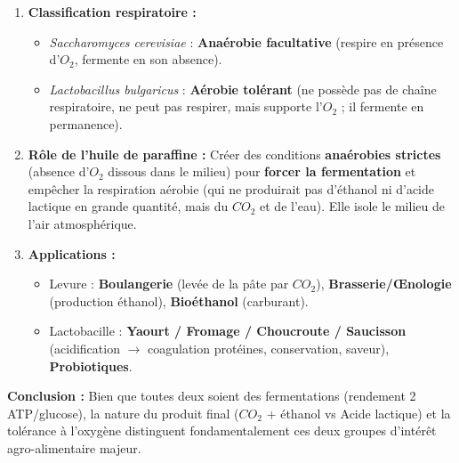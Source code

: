 \documentclass[11pt]{article}
\begin{document}
\begin{exoresolu}
\begin{enumerate}
\begin{itemize}
              \end{itemize}
        \item \textbf{Classification respiratoire :}
              \begin{itemize}
                  \item \emph{Saccharomyces cerevisiae} : \textbf{Anaérobie facultative} (respire en présence d'$O_2$, fermente en son absence).
                  \item \emph{Lactobacillus bulgaricus} : \textbf{Aérobie tolérant} (ne possède pas de chaîne respiratoire, ne peut pas respirer, mais supporte l'$O_2$ ; il fermente en permanence).
              \end{itemize}
        \item \textbf{Rôle de l'huile de paraffine :} Créer des conditions \textbf{anaérobies strictes} (absence d'$O_2$ dissous dans le milieu) pour \textbf{forcer la fermentation} et empêcher la respiration aérobie (qui ne produirait pas d'éthanol ni d'acide lactique en grande quantité, mais du $CO_2$ et de l'eau). Elle isole le milieu de l'air atmosphérique.
        \item \textbf{Applications :}
              \begin{itemize}
                  \item Levure : \textbf{Boulangerie} (levée de la pâte par $CO_2$), \textbf{Brasserie/Œnologie} (production éthanol), \textbf{Bioéthanol} (carburant).
                  \item Lactobacille : \textbf{Yaourt / Fromage / Choucroute / Saucisson} (acidification $\rightarrow$ coagulation protéines, conservation, saveur), \textbf{Probiotiques}.
              \end{itemize}
    \end{enumerate}
    \textbf{Conclusion :} Bien que toutes deux soient des fermentations (rendement 2 ATP/glucose), la nature du produit final ($CO_2$ + éthanol vs Acide lactique) et la tolérance à l'oxygène distinguent fondamentalement ces deux groupes d'intérêt agro-alimentaire majeur.
\end{exoresolu}
\end{document}
